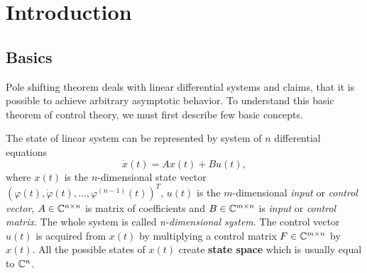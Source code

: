 \chapter{Introduction}
\label{chap:intr}

\section{Basics}
\label{sec:basics}

Pole shifting theorem deals with linear differential systems and claims, that it is possible to achieve arbitrary asymptotic behavior. To understand this basic theorem of control theory, we must first describe few basic concepts.



The state of linear system can be represented by system of $n$ differential equations $$\dot{x}(t)=Ax(t)+Bu(t),$$ where $x(t)$ is the $n$-dimensional state vector $(\varphi(t),\dot{\varphi}(t),\ldots,\varphi^{(n-1)}(t))^T$, $u(t)$ is the $m$-dimensional \textit{input} or \textit{control vector}, $A \in \mathbb{C} ^{n\times n}$ is matrix of coefficients and $B\in \mathbb{C} ^{m\times n}$ is \textit{input} or \textit{control matrix}. The whole system is called \textit{n-dimensional system}. The control vector $u(t)$ is acquired from $x(t)$ by multiplying a control matrix $F\in \mathbb{C} ^{m\times n}$ by $x(t)$. All the possible states of $x(t)$ create \textbf{state space} which is usually equal to $\mathbb{C}^n$. 

